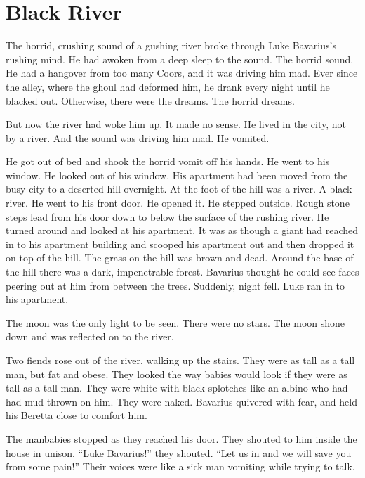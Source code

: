 \chapter{Black River}





\noindent The horrid, crushing sound of a gushing river broke through Luke
Bavarius's rushing mind. He had awoken from a deep sleep to the
sound. The horrid sound. He had a hangover from too many Coors, and
it was driving him mad. Ever since the alley, where the ghoul had
deformed him, he drank every night until he blacked out. Otherwise,
there were the dreams. The horrid dreams.

But now the river had woke him up. It made no sense. He lived in
the city, not by a river. And the sound was driving him mad. He
vomited.

He got out of bed and shook the horrid vomit off his hands. He went
to his window. He looked out of his window. His apartment had been
moved from the busy city to a deserted hill overnight. At the foot
of the hill was a river. A black river. He went to his front door.
He opened it. He stepped outside. Rough stone steps lead from his
door down to below the surface of the rushing river. He turned
around and looked at his apartment. It was as though a giant had
reached in to his apartment building and scooped his apartment out
and then dropped it on top of the hill. The grass on the hill was
brown and dead. Around the base of the hill there was a dark,
impenetrable forest. Bavarius thought he could see faces peering
out at him from between the trees. Suddenly, night fell. Luke ran
in to his apartment.

The moon was the only light to be seen. There were no stars. The
moon shone down and was reflected on to the river.

Two fiends rose out of the river, walking up the stairs. They were
as tall as a tall man, but fat and obese. They looked the way
babies would look if they were as tall as a tall man. They were
white with black splotches like an albino who had had mud thrown on
him. They were naked. Bavarius quivered with fear, and held his
Beretta close to comfort him.

The manbabies stopped as they reached his door. They shouted to him
inside the house in unison. ``Luke Bavarius!'' they shouted. ``Let us
in and we will save you from some pain!'' Their voices were like a
sick man vomiting while trying to talk.

